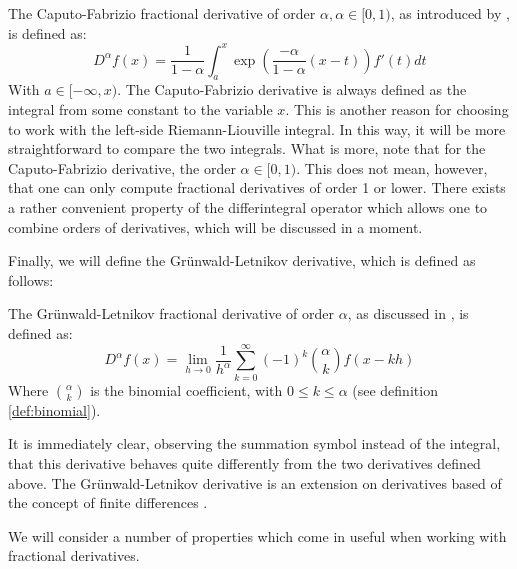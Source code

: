 \begin{definition}\label{d: CF}
    The Caputo-Fabrizio fractional derivative of order \(\alpha, \alpha \in [0,1)\), as introduced by \citet{caputo2015}, is defined as:
    \begin{equation}
        D^{\alpha} f(x) = \frac{1}{1 - \alpha}  \int_{a}^{x} \exp\left(\frac{-\alpha}{1 - \alpha}(x-t)\right) f'(t) dt
    \end{equation}
    With \(a \in [-\infty, x)\).
    The Caputo-Fabrizio derivative is always defined as the integral from some constant to the variable \(x\). This is another reason for choosing to work with the left-side Riemann-Liouville integral. In this way, it will be more straightforward to compare the two integrals. What is more, note that for the Caputo-Fabrizio derivative, the order \(\alpha \in [0, 1)\). This does not mean, however, that one can only compute fractional derivatives of order 1 or lower. There exists a rather convenient property of the differintegral operator which allows one to combine orders of derivatives, which will be discussed in a moment.
    
\end{definition}

Finally, we will define the Grünwald-Letnikov derivative, which is defined as follows:
\begin{definition}
    The Grünwald-Letnikov fractional derivative of order \(\alpha\), as discussed in \citet{zhmakin2022}, is defined as:
    \begin{equation}
        D^\alpha f(x) = \lim_{h \to 0} \frac{1}{h^\alpha} \sum_{k=0}^\infty (-1)^k \binom{\alpha}{k} f(x - k h)
    \end{equation}
   Where \(\binom{\alpha}{k}\) is the binomial coefficient, with \(0 \leq k \leq \alpha\) (see definition \ref{def:binomial}).
\end{definition}
It is immediately clear, observing the summation symbol instead of the integral, that this derivative behaves quite differently from the two derivatives defined above. The Grünwald-Letnikov derivative is an extension on derivatives based of the concept of finite differences \citep{flajolet1995}.

We will consider a number of properties which come in useful when working with fractional derivatives.

